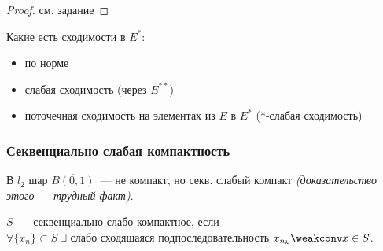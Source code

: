 \begin{proof}
    см. задание
\end{proof}

Какие есть сходимости в $E^*$:
\begin{itemize}
    \item[$\Downarrow$] по норме
    \item[$\Downarrow$] слабая сходимость (через $E^{**}$)
    \item[-] поточечная сходимость на элементах из $E$ в $E^*$ (*-слабая сходимость)
\end{itemize}

\subsubsection{Секвенциально слабая компактность}


\begin{example}
    В $l_2$ шар $\overline{B(0, 1)}$~--- не компакт, но секв. слабый компакт \textit{(доказательство этого --- трудный факт)}.
\end{example}

\begin{definition}
    $S$~--- секвенциально слабо компактное, если\\
    $\forall \{ x_n \} \subset S \; \exists$ слабо сходящаяся подпоследовательность $x_{n_k} \weakconv x \in S$.
\end{definition}